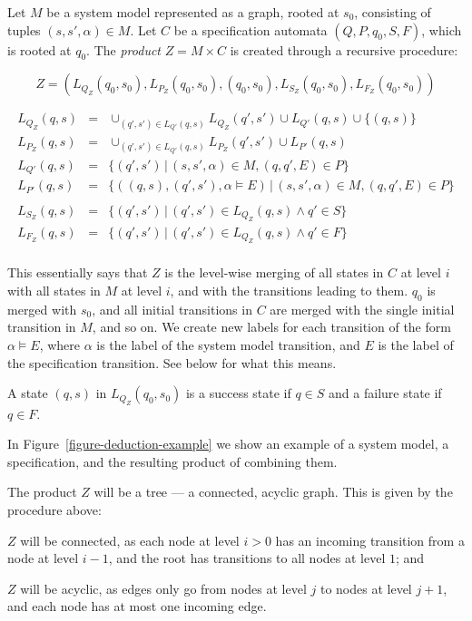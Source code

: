 \begin{mydef}
Let $M$ be a system model represented as a graph, rooted at $s_0$, consisting
of tuples $(s,s',\alpha) \in M$. Let $C$ be a specification automata $(Q, P,
q_0, S, F)$, which is rooted at $q_0$. The \textit{product} $Z = M \times C$ is
created through a recursive procedure:

\medskip
\[
  Z = (L_{Q_Z}(q_0,s_0), L_{P_Z}(q_0,s_0), (q_0,s_0), L_{S_Z}(q_0,s_0), L_{F_Z}(q_0,s_0))
\]

\[
  \begin{array}{rcl}
   L_{Q_Z}(q,s) & = & \cup_{(q',s') \in L_{Q'}(q,s)} L_{Q_Z}(q',s') \cup L_{Q'}(q,s) \cup \{(q,s)\} \\
   L_{P_Z}(q,s) & = & \cup_{(q',s') \in L_{Q'}(q,s)} L_{P_Z}(q',s') \cup L_{P'}(q,s) \\
    L_{Q'}(q,s) & = & \{(q',s') \, | \, (s,s',\alpha) \in M, (q,q',E) \in P\} \\
    L_{P'}(q,s) & = & \{((q,s), (q',s'), \alpha \models E) \, | \, (s,s',\alpha) \in M, (q,q',E) \in P\} \\
                & & \\
   L_{S_Z}(q,s) & = & \{(q',s') \, | \, (q',s') \in L_{Q_Z}(q,s) \wedge q' \in S\} \\
   L_{F_Z}(q,s) & = & \{(q',s') \, | \, (q',s') \in L_{Q_Z}(q,s) \wedge q' \in F\} \\
  \end{array}
\]
\medskip

This essentially says that $Z$ is the level-wise merging of all states in $C$
at level $i$ with all states in $M$ at level $i$, and with the transitions
leading to them. $q_0$ is merged with $s_0$, and all initial transitions in $C$
are merged with the single initial transition in $M$, and so on. We create new
labels for each transition of the form $\alpha \models E$, where $\alpha$ is
the label of the system model transition, and $E$ is the label of the
specification transition. See below for what this means.

A state $(q,s)$ in $L_{Q_Z}(q_0,s_0)$ is a success state if $q \in S$ and a
failure state if $q \in F$.

\end{mydef}

In Figure~\ref{figure-deduction-example} we show an example of a system model,
a specification, and the resulting product of combining them.

\begin{mylemma}
The product $Z$ will be a tree --- a connected, acyclic graph. This is given by
the procedure above:
\begin{inparaenum}[1\upshape)]
  \item $Z$ will be connected, as each node at level $i > 0$ has an incoming
    transition from a node at level $i-1$, and the root has transitions to all
    nodes at level $1$; and
  \item $Z$ will be acyclic, as edges only go from nodes at level $j$ to nodes
    at level $j+1$, and each node has at most one incoming edge.
  \end{inparaenum}
\end{mylemma}

